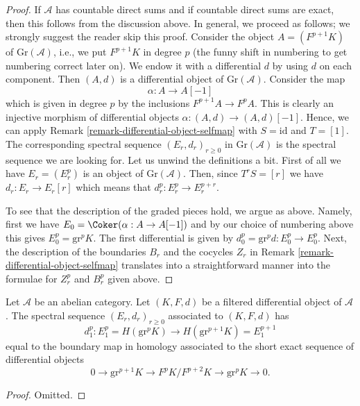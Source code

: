 \begin{proof}
If $\mathcal{A}$ has countable direct sums and if countable direct
sums are exact, then this follows from the discussion above.
In general, we proceed as follows; we strongly suggest the reader
skip this proof. Consider the object $A = (F^{p + 1}K)$ of
$\text{Gr}(\mathcal{A})$, i.e., we put $F^{p + 1}K$ in degree $p$
(the funny shift in numbering to get numbering correct later on).
We endow it with a differential $d$ by using $d$ on each component.
Then $(A, d)$ is a differential object of $\text{Gr}(\mathcal{A})$.
Consider the map
$$
\alpha : A \to A[-1]
$$
which is given in degree $p$ by the inclusions $F^{p + 1}A \to F^pA$.
This is clearly an injective morphism of differential objects
$\alpha : (A, d) \to (A, d)[-1]$. Hence, we can apply
Remark \ref{remark-differential-object-selfmap}
with $S = \text{id}$ and $T = [1]$.
The corresponding spectral sequence $(E_r, d_r)_{r \geq 0}$
in $\text{Gr}(\mathcal{A})$ is the spectral sequence we are looking
for. Let us unwind the definitions a bit.
First of all we have $E_r = (E_r^p)$ is an object of $\text{Gr}(\mathcal{A})$.
Then, since $T^rS = [r]$ we have $d_r : E_r \to E_r[r]$ which means that
$d_r^p : E_r^p \to E_r^{p + r}$.

\medskip\noindent
To see that the description of the graded pieces hold, we argue
as above. Namely, first we have $E_0 = \Coker(\alpha : A \to A[-1])$
and by our choice of numbering above this gives
$E_0^p = \text{gr}^pK$. The first differential is given by
$d_0^p = \text{gr}^pd : E_0^p \to E_0^p$.
Next, the description of the boundaries $B_r$ and the cocycles $Z_r$
in Remark \ref{remark-differential-object-selfmap}
translates into a straightforward manner into the formulae
for $Z_r^p$ and $B_r^p$ given above.
\end{proof}

\begin{lemma}
\label{lemma-spectral-sequence-filtered-differential-d1}
Let $\mathcal{A}$ be an abelian category. Let $(K, F, d)$ be a filtered
differential object of $\mathcal{A}$. The spectral sequence
$(E_r, d_r)_{r \geq 0}$ associated to $(K, F, d)$ has
$$
d_1^p :
E_1^p = H(\text{gr}^pK)
\longrightarrow
H(\text{gr}^{p + 1}K) = E_1^{p + 1}
$$
equal to the boundary map in homology associated to the short
exact sequence of differential objects
$$
0 \to \text{gr}^{p + 1}K \to F^pK/F^{p + 2}K \to \text{gr}^pK \to 0.
$$
\end{lemma}

\begin{proof}
Omitted.
\end{proof}

